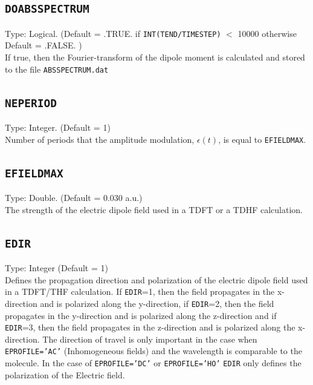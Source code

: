 \documentclass[a4paper,twoside,openany]{book}
\begin{document}
 \subsection{\texttt{DOABSSPECTRUM}}
 Type: Logical. (Default = .TRUE. if \texttt{INT(TEND/TIMESTEP)} $<$ 10000 otherwise Default = .FALSE.  )\\
 If true, then the Fourier-transform of the dipole moment is calculated and stored to the file \texttt{ABSSPECTRUM.dat }
 
 \subsection{\texttt{NEPERIOD}}
Type: Integer. (Default = 1)\\
Number of periods that the amplitude modulation, $\epsilon(t)$,  is equal to  \texttt{EFIELDMAX}.
 
 \subsection{\texttt{EFIELDMAX}}
 Type: Double. (Default = 0.030 a.u.)\\
 The strength of the electric dipole field used in a TDFT or a TDHF calculation.
 
 \subsection{\texttt{EDIR}}
 Type: Integer (Default = 1)\\
Defines the propagation direction and polarization of the electric dipole field used in a TDFT/THF calculation. If \texttt{EDIR}=1, then the field propagates in the x-direction and is polarized along the y-direction, 
if \texttt{EDIR}=2, then the field propagates in the y-direction and is polarized along the z-direction and if \texttt{EDIR}=3, then the field propagates in the z-direction and is polarized along the x-direction. 
The direction of travel is only important in the case when \texttt{EPROFILE='AC'} (Inhomogeneous fields)  and the wavelength is comparable to the molecule. In the case of \texttt{EPROFILE='DC'} or \texttt{EPROFILE='HO'}
 \texttt{EDIR} only defines the polarization of the Electric field.
\end{document}

